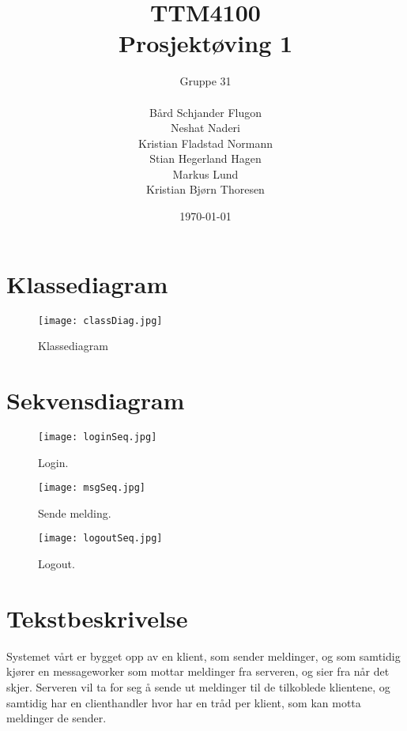 \documentclass[a4paper]{article}
\title{TTM4100 \\ Prosjektøving 1}
\author{Gruppe 31 \\\\ Bård Schjander Flugon \\ Neshat Naderi \\ Kristian Fladstad Normann \\ Stian Hegerland Hagen \\ Markus Lund \\ Kristian Bjørn Thoresen}
\date{\today}
\begin{document}
\maketitle
\clearpage

\section*{Klassediagram}
\label {sec:class}

\begin{figure}[ht]
\centering
\texttt{[image: classDiag.jpg]}
\caption{\label{fig:classDiag}Klassediagram}
\end{figure}



\section*{Sekvensdiagram}
\label{sec:sek}

\begin{figure}[ht]
\centering
\texttt{[image: loginSeq.jpg]}
\caption{\label{fig:loginSeq}Login.}
\end{figure}

\begin{figure}[ht]
\centering
\texttt{[image: msgSeq.jpg]}
\caption{\label{fig:msgSeq}Sende melding.}
\end{figure}

\begin{figure}[ht]
\centering
\texttt{[image: logoutSeq.jpg]}
\caption{\label{fig:logoutSeq}Logout.}
\end{figure}
\clearpage

\section*{Tekstbeskrivelse}

Systemet vårt er bygget opp av en klient, som sender meldinger, og som samtidig kjører en messageworker som mottar meldinger fra serveren, og sier fra når det skjer. Serveren vil ta for seg å sende ut meldinger til de tilkoblede klientene, og samtidig har en clienthandler hvor har en tråd per klient, som kan motta meldinger de sender.
\end{document}
